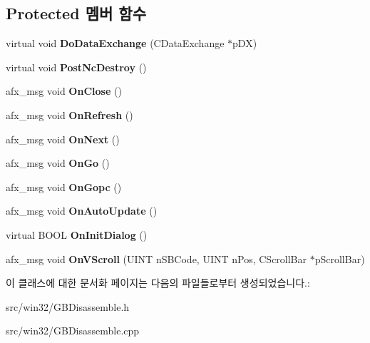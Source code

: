 \subsection*{Protected 멤버 함수}
\begin{DoxyCompactItemize}
\item 
\mbox{\label{class_g_b_disassemble_a38c5f5c6c903e54fb87b5c6eaa4afc73}} 
virtual void {\bfseries Do\+Data\+Exchange} (C\+Data\+Exchange $\ast$p\+DX)
\item 
\mbox{\label{class_g_b_disassemble_a0302b8ddf70b5c788766fbed0e0c852e}} 
virtual void {\bfseries Post\+Nc\+Destroy} ()
\item 
\mbox{\label{class_g_b_disassemble_a2cbf8f743dec4f14119762d81f77ad60}} 
afx\+\_\+msg void {\bfseries On\+Close} ()
\item 
\mbox{\label{class_g_b_disassemble_a44507cea06041430c59bfe5586f4914a}} 
afx\+\_\+msg void {\bfseries On\+Refresh} ()
\item 
\mbox{\label{class_g_b_disassemble_ac818bf955fab0b2433d68ed992033169}} 
afx\+\_\+msg void {\bfseries On\+Next} ()
\item 
\mbox{\label{class_g_b_disassemble_a567143c841e67475b78afe7aca95f520}} 
afx\+\_\+msg void {\bfseries On\+Go} ()
\item 
\mbox{\label{class_g_b_disassemble_abd524f55b59a178d22778d9e5b80905f}} 
afx\+\_\+msg void {\bfseries On\+Gopc} ()
\item 
\mbox{\label{class_g_b_disassemble_a5fad3e2f0c06721bd881fa0dda1001e4}} 
afx\+\_\+msg void {\bfseries On\+Auto\+Update} ()
\item 
\mbox{\label{class_g_b_disassemble_a62b06166477944c21edeeda699fcdba5}} 
virtual B\+O\+OL {\bfseries On\+Init\+Dialog} ()
\item 
\mbox{\label{class_g_b_disassemble_a80098655a0c93eeecc024a57ac0519ee}} 
afx\+\_\+msg void {\bfseries On\+V\+Scroll} (U\+I\+NT n\+S\+B\+Code, U\+I\+NT n\+Pos, C\+Scroll\+Bar $\ast$p\+Scroll\+Bar)
\end{DoxyCompactItemize}


이 클래스에 대한 문서화 페이지는 다음의 파일들로부터 생성되었습니다.\+:\begin{DoxyCompactItemize}
\item 
src/win32/G\+B\+Disassemble.\+h\item 
src/win32/G\+B\+Disassemble.\+cpp\end{DoxyCompactItemize}
